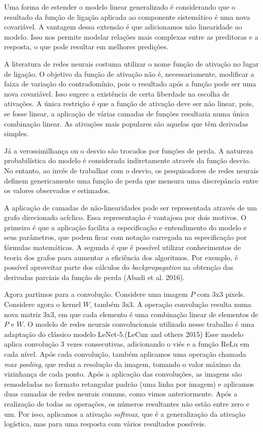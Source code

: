 \documentclass[]{elsarticle} %
\begin{document}
Uma forma de estender o modelo linear generalizado é considerando que o resultado da função de ligação aplicada ao componente sistemático é uma nova covariável. A vantagem dessa extensão é que adicionamos não linearidade ao modelo. Isso nos permite modelar relações mais complexas entre as preditoras e a resposta, o que pode resultar em melhores predições.

A literatura de redes neurais costuma utilizar o nome função de ativação no lugar de ligação. O objetivo da função de ativação não é, necessariamente, modificar a faixa de variação do contradomínio, pois o resultado após a função pode ser uma nova covariável. Isso sugere a existência de certa liberdade na escolha de ativações. A única restrição é que a função de ativação deve ser não linear, pois, se fosse linear, a aplicação de várias camadas de funções resultaria numa única combinação linear. As ativações mais populares são aquelas que têm derivadas simples.

Já a verossimilhança ou o desvio são trocados por funções de perda. A natureza probabilística do modelo é considerada indiretamente através da função desvio. No entanto, ao invés de trabalhar com o desvio, os pesquisadores de redes neurais definem genericamente uma função de perda que mensura uma discrepância entre os valores observados e estimados.

A aplicação de camadas de não-linearidades pode ser representada através de um grafo direcionado acíclico. Essa representação é vantajosa por dois motivos. O primeiro é que a aplicação facilita a especificação e entendimento do modelo e seus parâmetros, que podem ficar com notação carregada na especificação por fórmulas matemáticas. A segunda é que é possível utilizar conhecimentos de teoria dos grafos para aumentar a eficiência dos algoritmos. Por exemplo, é possível aproveitar parte dos cálculos do \emph{backpropagation} na obtenção das derivadas parciais da função de perda (Abadi et al. 2016).

Agora partimos para a convolução. Considere uma imagem \(P\) com 3x3 pixels. Considere agora o kernel \(W\), também 3x3. A operação convolução resulta numa nova matriz 3x3, em que cada elemento é uma combinação linear de elementos de \(P\) e \(W\). O modelo de redes neurais convolucionais utilizado nesse trabalho é uma adaptação do clássico modelo LeNet-5.(LeCun and others 2015) Esse modelo aplica convolução 3 vezes consecutivas, adicionando o viés e a função ReLu em cada nível. Após cada convolução, também aplicamos uma operação chamada \emph{max pooling}, que reduz a resolução da imagem, tomando o valor máximo da vizinhança de cada ponto. Após a aplicação das convoluções, as imagens são remodeladas no formato retangular padrão (uma linha por imagem) e aplicamos duas camadas de redes neurais comuns, como vimos anteriormente. Após a realização de todas as operações, os números resultantes não estão entre zero e um. Por isso, aplicamos a ativação \emph{softmax}, que é a generalização da ativação logística, mas para uma resposta com vários resultados possíveis.
\end{document}
